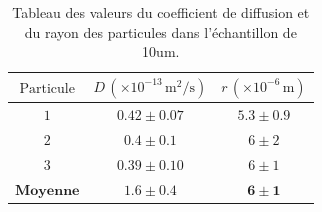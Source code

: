 \documentclass[11pt,letterpaper]{article}
\begin{document}
\begin{table}[H]
  \centering
  \caption{Tableau des valeurs du coefficient de diffusion et du rayon des particules dans l'échantillon de 10um.}
  \begin{tabular}{|c|c|c|}
  \hline
  \( \text{Particule} \) &\( D \, (\times 10^{-13} \, \text{m}^2/\text{s}) \) & \( r \, (\times 10^{-6} \, \text{m}) \) \\
  \hline
  \( 1 \) &\( 0.42 \pm 0.07 \) & \( 5.3 \pm 0.9 \) \\
  \( 2 \) &\( 0.4 \pm 0.1 \) & \( 6 \pm 2 \) \\
  \( 3 \) &\( 0.39 \pm 0.10 \) & \( 6 \pm 1 \) \\
  \hline
  \hline
  \( \textbf{Moyenne} \) & \( \mathbf{1.6 \pm 0.4} \) & \( \mathbf{6 \pm 1} \) \\
  \hline
  \end{tabular}
\end{table}
\end{document}
